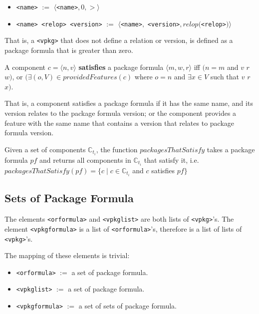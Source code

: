 \begin{itemize}
  \item \texttt{<name>} $:=$ $\langle $\texttt{<name>}$, 0 , > \rangle$
  \item \texttt{<name> <relop> <version>} $:=$ $\langle $\texttt{<name>}$,$ \texttt{<version>}$, relop($\texttt{<relop>}$) \rangle$
\end{itemize}
That is, a \texttt{<vpkg>} that does not define a relation or version, is defined as a package formula that is greater than zero.

\begin{defs}
A component $c = \langle n,v \rangle$ \textbf{satisfies} a package formula $\langle m,w,r\rangle$ iff
$(n = m$ and $v$ $r$ $w)$, or $(\exists (o,V) \in providedFeatures(c)$ where $o = n$ and $\exists x \in V$ such that $v$ $r$ $x)$. 
\end{defs}
That is, a component satisfies a package formula if it has the same name, and its version relates to the package formula version;
or the component provides a feature with the same name that contains a version that relates to package formula version.

\begin{defs}
Given a set of components $\mathbb{C}_{t_i}$,
the function $packagesThatSatisfy$ takes a package formula $pf$ and returns all components in  $\mathbb{C}_{t_i}$ that satisfy it, i.e. $packagesThatSatisfy(pf) = \{c \mid c \in \mathbb{C}_{t_i}$ and $ c$ satisfies $pf\}$
\end{defs}

\subsection{Sets of Package Formula}
The elements \texttt{<orformula>} and \texttt{<vpkglist>} are both lists of \texttt{<vpkg>}'s.
The element \texttt{<vpkgformula>} is a list of \texttt{<orformula>}'s, therefore is a list of lists of \texttt{<vpkg>}'s.

The mapping of these elements is trivial:
\begin{itemize}
  \item \texttt{<orformula>} $ := $ a set of package formula.
  \item \texttt{<vpkglist>} $ := $ a set of package formula.
  \item \texttt{<vpkgformula>} $ := $ a set of sets of package formula.
\end{itemize}

